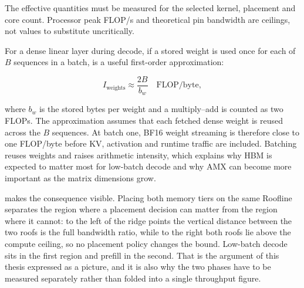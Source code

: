 The effective quantities must be measured for the selected kernel,
placement and core count.  Processor peak FLOP/s and theoretical pin
bandwidth are ceilings, not values to substitute uncritically.

For a dense linear layer during decode, if a stored weight is used once
for each of \(B\) sequences in a batch,  is a
useful first-order approximation:

\begin{equation}
\label{eq:intensity}
  I_{\mathrm{weights}} \approx \frac{2B}{b_w}
  \quad \text{FLOP/byte},
\end{equation}

where \(b_w\) is the stored bytes per weight and a multiply--add is
counted as two FLOPs.  The approximation assumes that each fetched dense
weight is reused across the \(B\) sequences.  At batch one, BF16 weight
streaming is therefore close to one FLOP/byte before KV,
activation and runtime traffic are included.  Batching reuses weights
and raises arithmetic intensity, which explains why HBM is expected to
matter most for low-batch decode and why AMX can become more important
as the matrix dimensions grow.

 makes the consequence visible.  Placing both
memory tiers on the same Roofline separates the region where a placement
decision can matter from the region where it cannot: to the left of the
ridge points the vertical distance between the two roofs is the full
bandwidth ratio, while to the right both roofs lie above the compute
ceiling, so no placement policy changes the bound.  Low-batch decode
sits in the first region and prefill in the second.  That is the
argument of this thesis expressed as a picture, and it is also why the
two phases have to be measured separately rather than folded into a
single throughput figure.


